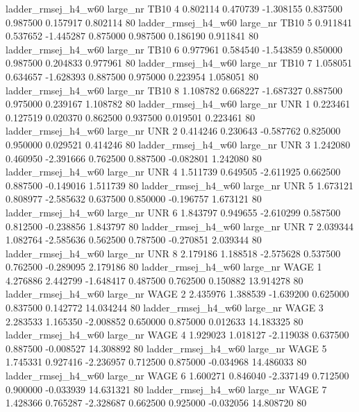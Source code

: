 ladder_rmsej_h4_w60   large_nr     TB10                 4  0.802114  0.470739  -1.308155 0.837500 0.987500  0.157917    0.802114 80
ladder_rmsej_h4_w60   large_nr     TB10                 5  0.911841  0.537652  -1.445287 0.875000 0.987500  0.186190    0.911841 80
ladder_rmsej_h4_w60   large_nr     TB10                 6  0.977961  0.584540  -1.543859 0.850000 0.987500  0.204833    0.977961 80
ladder_rmsej_h4_w60   large_nr     TB10                 7  1.058051  0.634657  -1.628393 0.887500 0.975000  0.223954    1.058051 80
ladder_rmsej_h4_w60   large_nr     TB10                 8  1.108782  0.668227  -1.687327 0.887500 0.975000  0.239167    1.108782 80
ladder_rmsej_h4_w60   large_nr      UNR                 1  0.223461  0.127519   0.020370 0.862500 0.937500  0.019501    0.223461 80
ladder_rmsej_h4_w60   large_nr      UNR                 2  0.414246  0.230643  -0.587762 0.825000 0.950000  0.029521    0.414246 80
ladder_rmsej_h4_w60   large_nr      UNR                 3  1.242080  0.460950  -2.391666 0.762500 0.887500 -0.082801    1.242080 80
ladder_rmsej_h4_w60   large_nr      UNR                 4  1.511739  0.649505  -2.611925 0.662500 0.887500 -0.149016    1.511739 80
ladder_rmsej_h4_w60   large_nr      UNR                 5  1.673121  0.808977  -2.585632 0.637500 0.850000 -0.196757    1.673121 80
ladder_rmsej_h4_w60   large_nr      UNR                 6  1.843797  0.949655  -2.610299 0.587500 0.812500 -0.238856    1.843797 80
ladder_rmsej_h4_w60   large_nr      UNR                 7  2.039344  1.082764  -2.585636 0.562500 0.787500 -0.270851    2.039344 80
ladder_rmsej_h4_w60   large_nr      UNR                 8  2.179186  1.188518  -2.575628 0.537500 0.762500 -0.289095    2.179186 80
ladder_rmsej_h4_w60   large_nr     WAGE                 1  4.276886  2.442799  -1.648417 0.487500 0.762500  0.150882   13.914278 80
ladder_rmsej_h4_w60   large_nr     WAGE                 2  2.435976  1.388539  -1.639200 0.625000 0.837500  0.142772   14.034244 80
ladder_rmsej_h4_w60   large_nr     WAGE                 3  2.283533  1.165350  -2.008852 0.650000 0.875000  0.012633   14.183325 80
ladder_rmsej_h4_w60   large_nr     WAGE                 4  1.929023  1.018127  -2.119038 0.637500 0.887500 -0.008527   14.308892 80
ladder_rmsej_h4_w60   large_nr     WAGE                 5  1.745331  0.927416  -2.236957 0.712500 0.875000 -0.034968   14.486033 80
ladder_rmsej_h4_w60   large_nr     WAGE                 6  1.600271  0.846040  -2.337149 0.712500 0.900000 -0.033939   14.631321 80
ladder_rmsej_h4_w60   large_nr     WAGE                 7  1.428366  0.765287  -2.328687 0.662500 0.925000 -0.032056   14.808720 80

